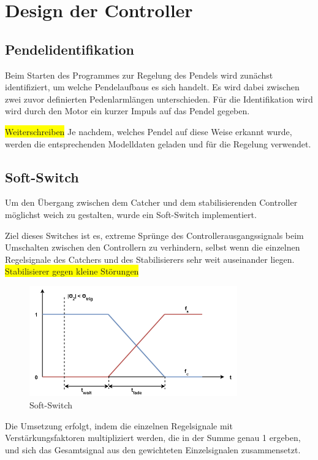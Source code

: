 \section{Design der Controller}
\subsection{Pendelidentifikation}
Beim Starten des Programmes zur Regelung des Pendels wird zunächst identifiziert, um welche Pendelaufbaus es sich handelt. Es wird dabei zwischen zwei zuvor definierten Pedenlarmlängen unterschieden.
Für die Identifikation wird wird durch den Motor ein kurzer Impuls auf das Pendel gegeben. 

\colorbox{yellow}{Weiterschreiben}
Je nachdem, welches Pendel auf diese Weise erkannt wurde, werden die entsprechenden Modelldaten geladen und für die Regelung verwendet.

\subsection{Soft-Switch}
Um den Übergang zwischen dem Catcher und dem stabilisierenden Controller möglichst weich zu gestalten, wurde ein Soft-Switch implementiert.

Ziel dieses Switches ist es, extreme Sprünge des Controllerausgangssignals beim Umschalten zwischen den Controllern zu verhindern, selbst wenn die einzelnen Regelsignale des Catchers und des Stabilisierers sehr weit auseinander liegen.
\colorbox{yellow}{Stabilisierer gegen kleine Störungen}
\begin{figure}[htbp]
	\centering	
	\label{fig.furuta-schematic}
	\includegraphics[width=0.8\textwidth]{Grafiken/SoftSwitch.png}
	\caption{Soft-Switch}
\end{figure}

Die Umsetzung erfolgt, indem die einzelnen Regelsignale mit Verstärkungsfaktoren multipliziert werden, die in der Summe genau 1 ergeben, und sich das Gesamtsignal aus den gewichteten Einzelsignalen zusammensetzt.

